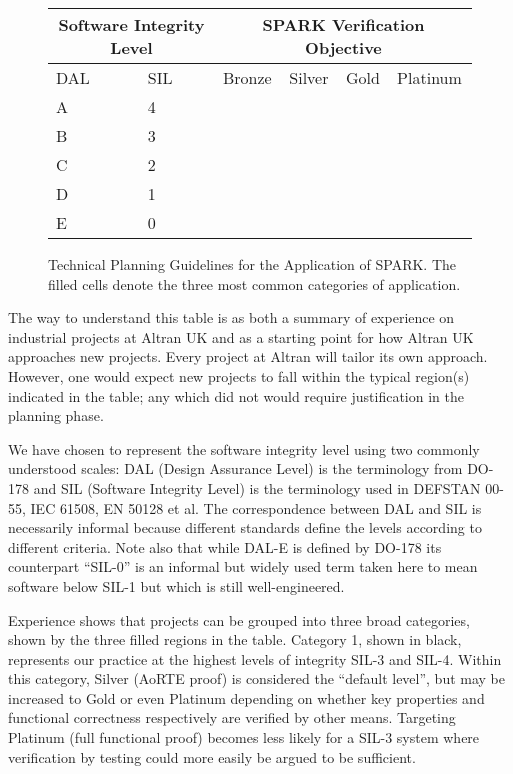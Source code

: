 \documentclass{llncs}
\begin{document}
\begin{figure}

\begin{center}
\begin{tabular}{|p{1.5cm}|p{1.5cm}|p{1.5cm}|p{1.5cm}|p{1.5cm}|p{1.5cm}|} \hline
\multicolumn{2}{|c|}{Software Integrity Level} & \multicolumn{4}{c|}{SPARK Verification Objective} \\  \hline
DAL & SIL & Bronze & Silver & Gold & Platinum \\ \hline
A   & 4   &        & \cellcolor{black} & \cellcolor{black} & \cellcolor{black} \\ \hline
B   & 3   &        & \cellcolor{black} & \cellcolor{black} & \cellcolor{black} \\ \hline
C   & 2   &        & \cellcolor{black!50} & \cellcolor{black!50} & \\ \hline
D   & 1   &        & \cellcolor{black!50} & \cellcolor{black!50} & \\ \hline
E   & 0   & \cellcolor{gray!30} & \cellcolor{gray!30} & & \\ \hline
\end{tabular}
\end{center}

\caption{Technical Planning Guidelines for the Application of SPARK.  The
  filled cells denote the three most common categories of application.}
\label{fig:levels}
\end{figure}

The way to understand this table is as both a summary of experience on
industrial projects at Altran UK and as a starting point for how Altran UK
approaches new projects. Every project at Altran will tailor its own
approach. However, one would expect new projects to fall within the typical
region(s) indicated in the table; any which did not would require justification
in the planning phase.

We have chosen to represent the software integrity level using two commonly
understood scales: DAL (Design Assurance Level) is the terminology from DO-178
and SIL (Software Integrity Level) is the terminology used in DEFSTAN 00-55,
IEC 61508, EN 50128 et al. The correspondence between DAL and SIL is
necessarily informal because different standards define the levels according to
different criteria. Note also that while DAL-E is defined by DO-178 its
counterpart ``SIL-0'' is an informal but widely used term taken here to mean
software below SIL-1 but which is still well-engineered.

Experience shows that projects can be grouped into three broad categories, shown by the three
filled regions in the table. Category 1, shown in black, represents our
practice at the highest levels of integrity SIL-3 and SIL-4. Within this
category, Silver (AoRTE proof) is considered the ``default level'', but may be
increased to Gold or even Platinum depending on whether key properties and
functional correctness respectively are verified by other means. Targeting
Platinum (full functional proof) becomes less likely for a SIL-3 system where
verification by testing could more easily be argued to be sufficient.
\end{document}
